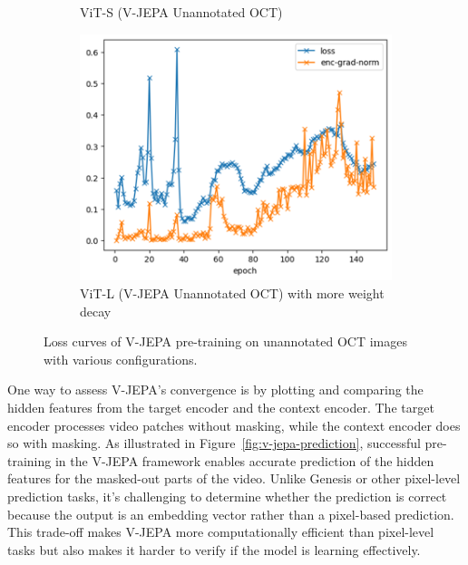 \documentclass[a4paper,11pt,oneside]{report}
\begin{document}
\begin{figure}[hbt]
\begin{subfigure}[t]{0.3\textwidth}
        \caption{ViT-S (V-JEPA Unannotated OCT)}
    \end{subfigure}\hfill%
    \begin{subfigure}[t]{0.3\textwidth}
        \centering
        \includegraphics[width=0.9\linewidth]{figures/discussion_vjepa_training_3.png}
        \caption{ViT-L (V-JEPA Unannotated OCT) with more weight decay}
    \end{subfigure}
    \caption{Loss curves of V-JEPA pre-training on unannotated OCT images with various configurations.}
    \label{fig:v-jepa-training}
\end{figure}

One way to assess V-JEPA's convergence is by plotting and comparing the hidden features from the target encoder and the context encoder. The target encoder processes video patches without masking, while the context encoder does so with masking. As illustrated in Figure~\ref{fig:v-jepa-prediction}, successful pre-training in the V-JEPA framework enables accurate prediction of the hidden features for the masked-out parts of the video. Unlike Genesis or other pixel-level prediction tasks, it's challenging to determine whether the prediction is correct because the output is an embedding vector rather than a pixel-based prediction. This trade-off makes V-JEPA more computationally efficient than pixel-level tasks but also makes it harder to verify if the model is learning effectively.
\end{document}
